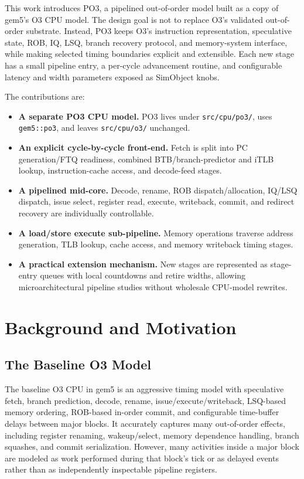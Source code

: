 \documentclass[10pt,twocolumn]{article}
\newcommand{\po}{\textsc{PO3}}
\newcommand{\oo}{\textsc{O3}}
\newcommand{\gem}{gem5}
\begin{document}
This work introduces \po{}, a pipelined out-of-order model built as a copy of \gem{}'s \oo{} CPU model.  The design goal is not to replace \oo{}'s validated out-of-order substrate.  Instead, \po{} keeps \oo{}'s instruction representation, speculative state, ROB, IQ, LSQ, branch recovery protocol, and memory-system interface, while making selected timing boundaries explicit and extensible.  Each new stage has a small pipeline entry, a per-cycle advancement routine, and configurable latency and width parameters exposed as SimObject knobs.

The contributions are:
\begin{itemize}
  \item \textbf{A separate \po{} CPU model.}  \po{} lives under \texttt{src/cpu/po3/}, uses \texttt{gem5::po3}, and leaves \texttt{src/cpu/o3/} unchanged.
  \item \textbf{An explicit cycle-by-cycle front-end.}  Fetch is split into PC generation/FTQ readiness, combined BTB/branch-predictor and iTLB lookup, instruction-cache access, and decode-feed stages.
  \item \textbf{A pipelined mid-core.}  Decode, rename, ROB dispatch/allocation, IQ/LSQ dispatch, issue select, register read, execute, writeback, commit, and redirect recovery are individually controllable.
  \item \textbf{A load/store execute sub-pipeline.}  Memory operations traverse address generation, TLB lookup, cache access, and memory writeback timing stages.
  \item \textbf{A practical extension mechanism.}  New stages are represented as stage-entry queues with local countdowns and retire widths, allowing microarchitectural pipeline studies without wholesale CPU-model rewrites.
\end{itemize}

\section{Background and Motivation}
\subsection{The Baseline \oo{} Model}
The baseline \oo{} CPU in \gem{} is an aggressive timing model with speculative fetch, branch prediction, decode, rename, issue/execute/writeback, LSQ-based memory ordering, ROB-based in-order commit, and configurable time-buffer delays between major blocks.  It accurately captures many out-of-order effects, including register renaming, wakeup/select, memory dependence handling, branch squashes, and commit serialization.  However, many activities inside a major block are modeled as work performed during that block's tick or as delayed events rather than as independently inspectable pipeline registers.
\end{document}
